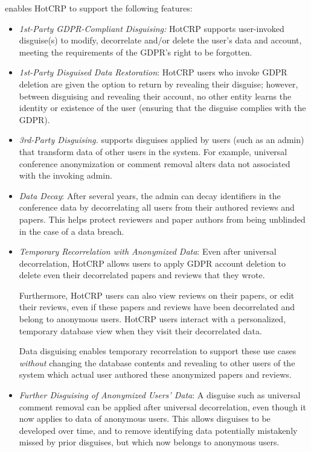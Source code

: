 
\sys enables HotCRP to support the following features:
\begin{itemize}
    \item\emph{1st-Party GDPR-Compliant Disguising:}
HotCRP supports user-invoked disguise(s) to modify, decorrelate and/or delete the user's data and
account, meeting the requirements of the GDPR's right to be forgotten.

    \item \emph{1st-Party Disguised Data Restoration}: HotCRP users who invoke GDPR deletion are given the
        option to return by revealing their disguise; however, between disguising and revealing
        their account, no other entity learns the identity or existence of the user (ensuring that
        the disguise complies with the GDPR).

    \item\emph{3rd-Party Disguising.}
\sys supports disguises applied by users (such as an admin) that transform data of other users in the system. For example, universal conference anonymization or
    comment removal alters data not associated with the invoking admin.

\item \emph{Data Decay}: After several years, the admin can decay identifiers in the conference data
    by decorrelating all users from their authored reviews and papers.  This helps protect reviewers
        and paper authors from being unblinded in the case of a data breach.

\item \emph{Temporary Recorrelation with Anonymized Data}:
Even after universal decorrelation, HotCRP allows users to apply GDPR account
deletion to delete even their decorrelated papers and reviews that they wrote.
%

%
Furthermore, HotCRP users can also view reviews on their papers, or edit their reviews, even if
        these papers and reviews have been decorrelated and belong to anonymous users.  HotCRP users
        interact with a personalized, temporary database view when they visit their decorrelated
        data.

Data disguising enables temporary recorrelation to support these use cases \emph{without} changing
        the database contents and revealing to other users of the system
which actual user authored these anonymized papers and reviews.

\item \emph{Further Disguising of Anonymized Users' Data}: A disguise such as universal comment
        removal can be applied after universal decorrelation, even though it now applies to data of anonymous users.
This allows disguises to be developed over time, and to remove identifying data potentially mistakenly missed by prior
disguises, but which now belongs to anonymous users.
\end{itemize}

